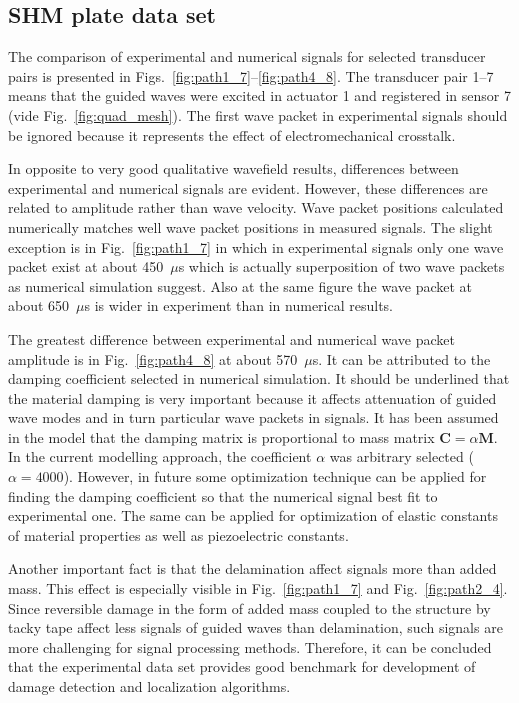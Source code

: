 \documentclass[preprint,12pt]{elsarticle}
\renewcommand{\bm}[1]{\mathbf{#1}}
\begin{document}
\subsection{SHM plate data set}
The comparison of experimental and numerical signals for selected transducer pairs is presented in Figs.~\ref{fig:path1_7}--\ref{fig:path4_8}. The transducer pair 1--7 means that the guided waves were excited in actuator 1 and registered in sensor 7 (vide Fig.~\ref{fig:quad_mesh}). The first wave packet in experimental signals should be ignored because it represents the effect of electromechanical crosstalk.

In opposite to very good qualitative wavefield results, differences between experimental and numerical signals are evident. However, these differences are related to amplitude rather than wave velocity. Wave packet positions calculated numerically matches well wave packet positions in measured signals. The slight exception is in Fig.~\ref{fig:path1_7} in which in experimental signals only one wave packet exist at about 450~$\mu$s which is actually superposition of two wave packets as numerical simulation suggest. Also at the same figure the wave packet at about 650~$\mu$s is wider in experiment than in numerical results. 

The greatest difference between experimental and numerical wave packet amplitude is in Fig.~\ref{fig:path4_8} at about 570~$\mu$s. It can be attributed to the damping coefficient selected in numerical simulation. It should be underlined that the material damping is very important because it affects attenuation of guided wave modes and in turn particular wave packets in signals. It has been assumed in the model that the damping matrix is proportional to mass matrix $\bm{C} = \alpha \bm{M}$. In the current modelling approach, the coefficient $\alpha$ was arbitrary selected ($\alpha = 4000$). However, in future some optimization technique can be applied for finding the damping coefficient so that the numerical signal best fit to experimental one. The same can be applied for optimization of elastic constants of material properties as well as piezoelectric constants. 

Another important fact is that the delamination affect signals more than added mass. This effect is especially visible in Fig.~\ref{fig:path1_7} and Fig.~\ref{fig:path2_4}. Since reversible damage in the form of added mass coupled to the structure by tacky tape affect less signals of guided waves than delamination, such signals are more challenging for signal processing methods. Therefore, it can be concluded that the experimental data set provides good benchmark for development of damage detection and localization algorithms.
\end{document}
